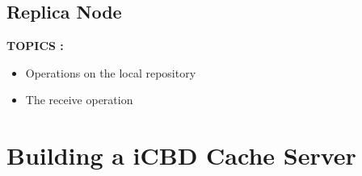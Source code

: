\subsection{Replica Node}
\label{sub:rep_replica_node}

\textbf{TOPICS :}
\begin{itemize}
	\item Operations on the local repository
	\item The receive operation
\end{itemize}




\section{Building a iCBD Cache Server}
\label{sec:impl_cache_server}



